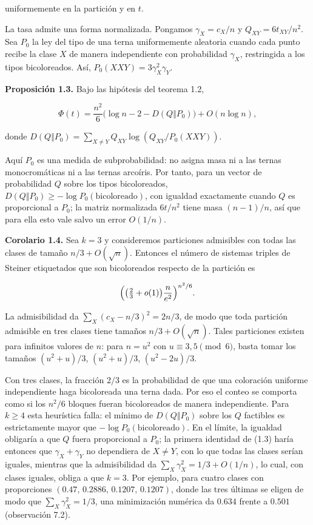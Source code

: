 \documentclass[spanish,11pt,a4paper]{article}
\begin{document}
uniformemente en la partición y en \(t\).

La tasa admite una forma normalizada. Pongamos \(\gamma_X=c_X/n\) y \(Q_{XY}=6t_{XY}/n^2\). Sea \(P_0\) la ley del tipo de una terna uniformemente aleatoria cuando cada punto recibe la clase \(X\) de manera independiente con probabilidad \(\gamma_X\), restringida a los tipos bicoloreados. Así, \(P_0(XXY)=3\gamma_X^2\gamma_Y\).

\textbf{Proposición 1.3.} Bajo las hipótesis del teorema 1.2,

\nopagebreak[4]
\[\Phi(t)=\frac{n^2}{6}\bigl(\log n-2-D(Q\Vert P_0)\bigr)+O(n\log n),\]

donde \(D(Q\Vert P_0)=\sum_{X\ne Y}Q_{XY}\log(Q_{XY}/P_0(XXY))\).

Aquí \(P_0\) es una medida de subprobabilidad: no asigna masa ni a las ternas monocromáticas ni a las ternas arcoíris. Por tanto, para un vector de probabilidad \(Q\) sobre los tipos bicoloreados, \(D(Q\Vert P_0)\ge-\log P_0(\text{bicoloreado})\), con igualdad exactamente cuando \(Q\) es proporcional a \(P_0\); la matriz normalizada \(6t/n^2\) tiene masa \((n-1)/n\), así que para ella esto vale salvo un error \(O(1/n)\).

\textbf{Corolario 1.4.} Sea \(k=3\) y consideremos particiones admisibles con todas las clases de tamaño \(n/3+O(\sqrt n)\). Entonces el número de sistemas triples de Steiner etiquetados que son bicoloreados respecto de la partición es

\nopagebreak[4]
\[\Bigl(\bigl(\tfrac23+o(1)\bigr)\frac{n}{e^2}\Bigr)^{n^2/6}.\]

La admisibilidad da \(\sum_X(c_X-n/3)^2=2n/3\), de modo que toda partición admisible en tres clases tiene tamaños \(n/3+O(\sqrt n)\). Tales particiones existen para infinitos valores de \(n\): para \(n=u^2\) con \(u\equiv3,5\pmod 6\), basta tomar los tamaños \((u^2+u)/3\), \((u^2+u)/3\), \((u^2-2u)/3\).

Con tres clases, la fracción \(2/3\) es la probabilidad de que una coloración uniforme independiente haga bicoloreada una terna dada. Por eso el conteo se comporta como si los \(n^2/6\) bloques fueran bicoloreados de manera independiente. Para \(k\ge4\) esta heurística falla: el mínimo de \(D(Q\Vert P_0)\) sobre los \(Q\) factibles es estrictamente mayor que \(-\log P_0(\text{bicoloreado})\). En el límite, la igualdad obligaría a que \(Q\) fuera proporcional a \(P_0\); la primera identidad de (1.3) haría entonces que \(\gamma_X+\gamma_Y\) no dependiera de \(X\ne Y\), con lo que todas las clases serían iguales, mientras que la admisibilidad da \(\sum_X\gamma_X^2=1/3+O(1/n)\), lo cual, con clases iguales, obliga a que \(k=3\). Por ejemplo, para cuatro clases con proporciones \((0.47,\,0.2886,\,0.1207,\,0.1207)\), donde las tres últimas se eligen de modo que \(\sum_X\gamma_X^2=1/3\), una minimización numérica da \(0.634\) frente a \(0.501\) (observación 7.2).
\end{document}
